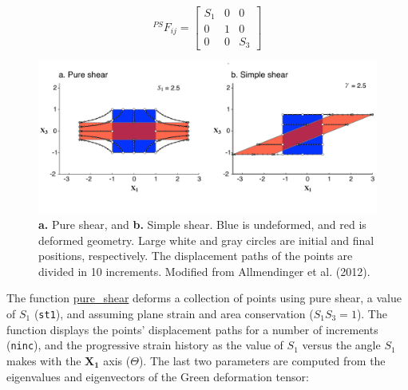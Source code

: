 \documentclass[a4paper , 12pt]{book}
\newcommand{\code}[1]{\colorbox{light-gray}{\texttt{#1}}}
\begin{document}
\begin{equation}
    { }^{PS}F_{ij}=\left[\begin{array}{ccc}S_{1} & 0 & 0 \\ 0 & 1 & 0 \\ 0 & 0 & S_{3}\end{array}\right]
\end{equation}

\begin{figure}[ht]
    \centering
    \includegraphics[width=13.5cm]{ch8f13.pdf}
    \caption{\textbf{a.} Pure shear, and \textbf{b.} Simple shear. Blue is undeformed, and red is deformed geometry. Large white and gray circles are initial and final positions, respectively. The displacement paths of the points are divided in 10 increments. Modified from Allmendinger et al. (2012).}
\end{figure}

The function \href{https://github.com/nfcd/compGeo/blob/master/source/functions/pure_shear.py}{pure\_shear} deforms a collection of points using pure shear, a value of $S_1$ (\code{st1}), and assuming plane strain and area conservation ($S_1S_3 = 1$). The function displays the points' displacement paths for a number of increments (\code{ninc}), and the progressive strain history as the value of $S_1$ versus the angle $S_1$ makes with the $\mathbf{X_1}$ axis ($\Theta$). The last two parameters are computed from the eigenvalues and eigenvectors of the Green deformation tensor:\newpage
\end{document}

